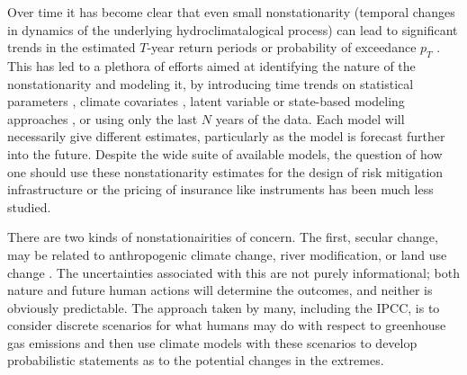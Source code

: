 \documentclass[12pt]{article}
\begin{document}
Over time it has become clear that even small nonstationarity (temporal changes in dynamics of the underlying hydroclimatalogical process) can lead to significant trends in the estimated \(T\)-year return periods or probability of exceedance \( p_T \) \citep{Milly2008,Vogel2011,Salas2014,Merz2014,Obeysekera2016}.
This has led to a plethora of efforts aimed at identifying the nature of the nonstationarity and modeling it, \eg{} by introducing time trends on statistical parameters \citep{Strupczewski2001,Vogel2011,Obeysekera2014,Serinaldi2015}, climate covariates \citep{Delgado2014,Griffis2007,Silva2016,Sun2014,Hall2014}, latent variable or state-based modeling approaches \citep{Griffis2007,Sveinsson2005,Waylen1986}, or using only the last \(N\) years of the data.
Each model will necessarily give different estimates, particularly as the model is forecast further into the future.
Despite the wide suite of available models, the question of how one should use these nonstationarity estimates for the design of risk mitigation infrastructure or the pricing of insurance like instruments has been much less studied.

There are two kinds of nonstationairities of concern.
The first, secular change, may be related to anthropogenic climate change, river modification, or land use change \citep{Merz2014}.
The uncertainties associated with this are not purely informational; both nature and future human actions will determine the outcomes, and neither is obviously predictable.
The approach taken by many, including the IPCC, is to consider discrete scenarios for what humans may do with respect to greenhouse gas emissions and then use climate models with these scenarios to develop probabilistic statements as to the potential changes in the extremes.
\end{document}
